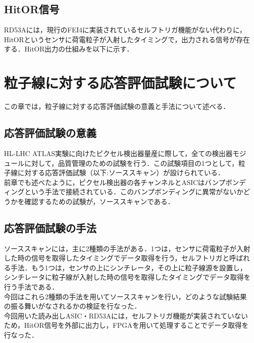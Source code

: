 \subsection{HitOR信号}
RD53Aには，現行のFEI4に実装されているセルフトリガ機能がない代わりに，HitORというセンサに荷電粒子が入射したタイミングで，出力される信号が存在する．HitOR出力の仕組みを以下に示す．

\section{粒子線に対する応答評価試験について}
この章では，粒子線に対する応答評価試験の意義と手法について述べる．
\subsection{応答評価試験の意義}
HL-LHC ATLAS実験に向けたピクセル検出器量産に際して，全ての検出器モジュールに対して，品質管理のための試験を行う．この試験項目の1つとして，粒子線に対する応答評価試験（以下:ソーススキャン）が設けられている．\\
前章でも述べたように，ピクセル検出器の各チャンネルとASICはバンプボンディングという手法で接続されている．このバンプボンディングに異常がないかどうかを確認するための試験が，ソーススキャンである．\\

\subsection{応答評価試験の手法}
ソーススキャンには，主に2種類の手法がある．1つは，センサに荷電粒子が入射した時の信号を取得したタイミングでデータ取得を行う，セルフトリガと呼ばれる手法．もう1つは，センサの上にシンチレータ，その上に粒子線源を設置し，シンチレータに粒子線が入射した時の信号を取得したタイミングでデータ取得を行う手法である．\\
今回はこれら2種類の手法を用いてソーススキャンを行い，どのような試験結果の振る舞いがなされるかの検証を行なった．\\
今回用いた読み出しASIC・RD53Aには，セルフトリガ機能が実装されていないため，HitOR信号を外部に出力し，FPGAを用いて処理することでデータ取得を行なった．


